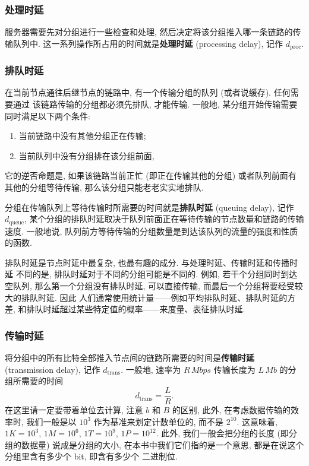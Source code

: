 \documentclass[10pt,UTF8]{book} %
\begin{document}
\subsubsection{处理时延}

服务器需要先对分组进行一些检查和处理, 然后决定将该分组推入哪一条链路的传输队列中.
这一系列操作所占用的时间就是\textbf{处理时延} (processing delay),
记作 $d_\mathrm{proc}$.

\subsubsection{排队时延}

在当前节点通往后继节点的链路中, 有一个传输分组的队列 (或者说缓存). 任何需要通过
该链路传输的分组都必须先排队, 才能传输. 一般地, 某分组开始传输需要同时满足以下两个条件:
\begin{enumerate}[label={${\arabic*}^\circ$}, itemsep=0pt]
    \item 当前链路中没有其他分组正在传输;
    \item 当前队列中没有分组排在该分组前面,
\end{enumerate}
它的逆否命题是, 如果该链路当前正忙 (即正在传输其他的分组) 或者队列前面有其他的分组等待传输,
那么该分组只能老老实实地排队.

分组在传输队列上等待传输时所需要的时间就是\textbf{排队时延} (queuing delay),
记作 $d_\mathrm{queue}$,
某个分组的排队时延取决于队列前面正在等待传输的节点数量和链路的传输速度. 一般地说,
队列前方等待传输的分组数量是到达该队列的流量的强度和性质的函数.

排队时延是节点时延中最复杂, 也最有趣的成分. 与处理时延、传输时延和传播时延
不同的是, 排队时延对于不同的分组可能是不同的. 例如, 若干个分组同时到达空队列,
那么第一个分组没有排队时延, 可以直接传输, 而最后一个分组将要经受较大的排队时延. 因此
人们通常使用统计量——例如平均排队时延、排队时延的方差,
和排队时延超过某些特定值的概率——来度量、表征排队时延.

\subsubsection{传输时延}

将分组中的所有比特全部推入节点间的链路所需要的时间是\textbf{传输时延}
(transmission delay), 记作
$d_\mathrm{trans}$. 一般地, 速率为 $R \, \si{Mbps}$ 传输长度为 
$L \, \si{Mb}$ 的分组所需要的时间
\[ d_\mathrm{trans} = \dfrac{L}{R}. \]
在这里请一定要带着单位去计算, 注意 $\si{b}$ 和 $\si{B}$ 的区别, 此外,
在考虑数据传输的效率时, 我们一般是以 $10^3$ 作为基准来划定计数单位的, 而不是
$2^{10}$. 这意味着, $1 \si{K} = 10^3$, $1 \si{M} = 10^6$,
$1 \si{T} = 10^9$, $1 \si{P} = 10^{12}$.
此外, 我们一般会把分组的长度 (即分组的数据量) 说成是分组的大小,
在本书中我们它们指的是一个意思, 都是在说这个分组里含有多少个 bit, 即含有多少个
二进制位.
\end{document}
